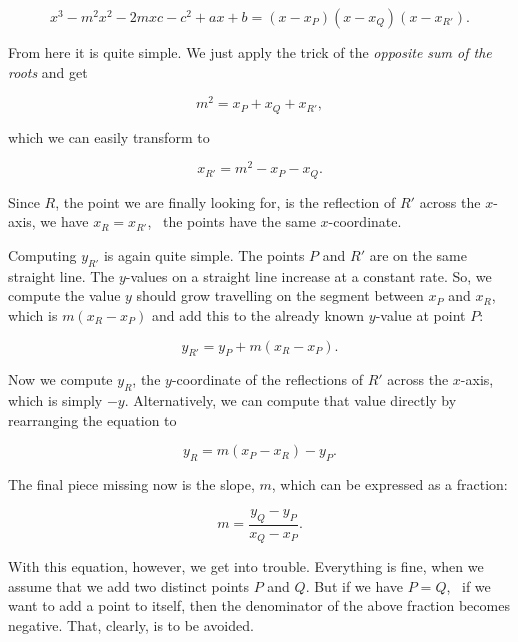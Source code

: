 \documentclass[tikz]{scrreprt}
\begin{document}
\begin{equation}  
x^3 - m^2x^2 - 2mxc - c^2 + ax + b = (x-x_P)(x-x_Q)(x-x_{R'}).
\end{equation}

From here it is quite simple. 
We just apply the trick of the 
\emph{opposite sum of the roots}
and get

\begin{equation}  
m^2 = x_P + x_Q + x_{R'},
\end{equation}

which we can easily transform to 

\begin{equation}  
x_{R'} = m^2 - x_P - x_Q. 
\end{equation}

Since $R$, the point we are finally looking for,
is the reflection of $R'$ across the $x$-axis,
we have $x_{R} = x_{R'}$, \ie\ the points have
the same $x$-coordinate.

Computing $y_{R'}$ is again quite simple.
The points $P$ and $R'$ are on the same 
straight line. The $y$-values on a straight line
increase at a constant rate. So, we compute
the value $y$ should grow travelling on the segment
between $x_P$ and $x_R$, which is
$m(x_R - x_P)$ and add this to the 
already known $y$-value at point $P$:

\begin{equation}
y_{R'} = y_P + m(x_R - x_P).
\end{equation}

Now we compute $y_R$, the $y$-coordinate
of the reflections of $R'$ across the $x$-axis,
which is simply $-y$. 
Alternatively, we can compute that 
value directly by rearranging the 
equation to

\begin{equation}
y_R = m(x_P - x_R)-y_P.
\end{equation}

The final piece missing now is the slope, $m$,
which can  be expressed as a fraction:

\begin{equation}
m = \frac{y_Q - y_P}{x_Q - x_P}.
\end{equation}

With this equation, however,
we get into trouble. Everything is fine,
when we assume that we add two distinct
points $P$ and $Q$. But if we have
$P = Q$, \ie\ if we want to add a point
to itself, then the denominator of
the above fraction becomes negative.
That, clearly, is to be avoided.
\end{document}
